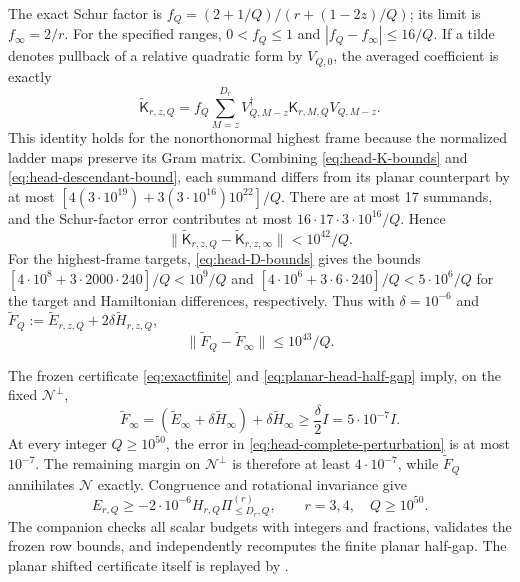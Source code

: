 \documentclass[11pt]{article}
\begin{document}
The exact Schur factor is
$f_Q=(2+1/Q)/(r+(1-2z)/Q)$; its limit is $f_\infty=2/r$.
For the specified ranges, $0<f_Q\le1$ and
$|f_Q-f_\infty|\le16/Q$. If a tilde denotes pullback of a relative
quadratic form by $V_{Q,0}$, the averaged coefficient is exactly
\begin{equation}\label{eq:head-Schur-pullback}
 \widetilde{\mathsf K}_{r,z,Q}
 =f_Q\sum_{M=z}^{D_r}
 V_{Q,M-z}^\dagger\mathsf K_{r,M,Q}V_{Q,M-z}.
\end{equation}
This identity holds for the nonorthonormal highest frame because the
normalized ladder maps preserve its Gram matrix. Combining
\eqref{eq:head-K-bounds} and \eqref{eq:head-descendant-bound}, each
summand differs from its planar counterpart by at most
$[4(3\cdot10^{19})+3(3\cdot10^{16})10^{22}]/Q$.
There are at most 17 summands, and the Schur-factor error contributes
at most $16\cdot17\cdot3\cdot10^{16}/Q$. Hence
\begin{equation}
 \|\widetilde{\mathsf K}_{r,z,Q}
       -\widetilde{\mathsf K}_{r,z,\infty}\|<10^{42}/Q.
\end{equation}
For the highest-frame targets, \eqref{eq:head-D-bounds} gives the bounds
$[4\cdot10^8+3\cdot2000\cdot240]/Q<10^9/Q$ and
$[4\cdot10^6+3\cdot6\cdot240]/Q<5\cdot10^6/Q$ for the target and
Hamiltonian differences, respectively. Thus with $\delta=10^{-6}$ and
$\widetilde F_Q:=\widetilde E_{r,z,Q}
 +2\delta\widetilde H_{r,z,Q}$,
\begin{equation}\label{eq:head-complete-perturbation}
 \|\widetilde F_Q-\widetilde F_\infty\|\le10^{43}/Q.
\end{equation}

The frozen certificate \eqref{eq:exactfinite} and
\eqref{eq:planar-head-half-gap} imply, on the fixed $\mathcal N^\perp$,
\begin{equation}
 \widetilde F_\infty
 =(\widetilde E_\infty+\delta\widetilde H_\infty)
   +\delta\widetilde H_\infty
 \ge\frac\delta2 I=5\cdot10^{-7}I.
\end{equation}
At every integer $Q\ge10^{50}$, the error in
\eqref{eq:head-complete-perturbation} is at most $10^{-7}$.
The remaining margin on $\mathcal N^\perp$ is therefore at least
$4\cdot10^{-7}$, while $\widetilde F_Q$ annihilates $\mathcal N$
exactly. Congruence and rotational invariance give
\begin{equation}\label{eq:explicit-head-result}
 E_{r,Q}\ge-2\cdot10^{-6}H_{r,Q}\Pi^{(r)}_{\le D_r,Q},
 \qquad r=3,4,\quad Q\ge10^{50}.
\end{equation}
The companion  checks all scalar
budgets with integers and fractions, validates the frozen row bounds, and
independently recomputes the finite planar half-gap. The planar shifted
certificate itself is replayed by .
\end{document}
